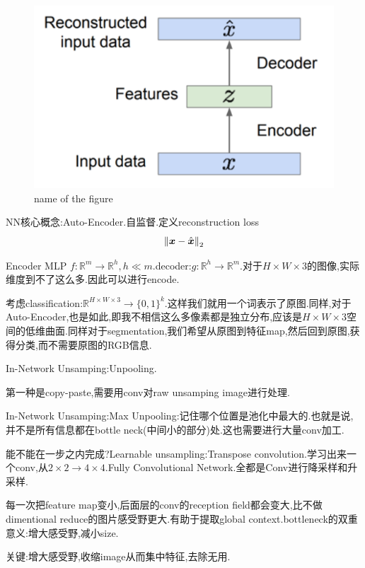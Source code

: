 \begin{figure}
	\includegraphics[scale=0.5]{figures/autoencoder.png}
	\caption{name of the figure}
\end{figure}
NN核心概念:Auto-Encoder.自监督.定义reconstruction loss
\begin{equation}
	\left \Vert \boldsymbol x - \hat{\boldsymbol{x}}  \right \Vert_2
\end{equation}

Encoder MLP $f:\mathbb R^m \to \mathbb R^h, h \ll m$.decoder:$g:\mathbb R^h \to \mathbb R^m$.对于$H \times W \times 3$的图像,实际维度到不了这么多.因此可以进行encode.

考虑classification:$\mathbb R^{H \times W \times 3} \to \{0, 1\}^{k}$.这样我们就用一个词表示了原图.同样,对于Auto-Encoder,也是如此,即我不相信这么多像素都是独立分布,应该是$H \times W \times 3$空间的低维曲面.同样对于segmentation,我们希望从原图到特征map,然后回到原图,获得分类,而不需要原图的RGB信息.

In-Network Unsamping:Unpooling.

第一种是copy-paste,需要用conv对raw unsamping image进行处理.

In-Network Unsamping:Max Unpooling:记住哪个位置是池化中最大的.也就是说,并不是所有信息都在bottle neck(中间小的部分)处.这也需要进行大量conv加工.

能不能在一步之内完成?Learnable unsampling:Transpose convolution.学习出来一个conv,从$2 \times 2 \to 4 \times 4$.Fully Convolutional Network.全都是Conv进行降采样和升采样.

每一次把feature map变小,后面层的conv的reception field都会变大,比不做dimentional reduce的图片感受野更大.有助于提取global context.bottleneck的双重意义:增大感受野,减小size.

关键:增大感受野,收缩image从而集中特征,去除无用.

